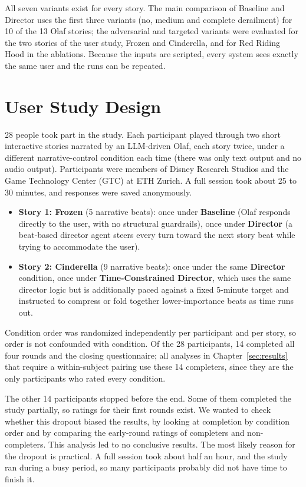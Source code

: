 All seven variants exist for every story. The main comparison of Baseline and Director uses the first three variants (no, medium and complete derailment) for 10 of the 13 Olaf stories; the adversarial and targeted variants were evaluated for the two stories of the user study, Frozen and Cinderella, and for Red Riding Hood in the ablations. Because the inputs are scripted, every system sees exactly the same user and the runs can be repeated.

\section{User Study Design}\label{sec:design-study}

28 people took part in the study. Each participant played through two short interactive stories narrated by an LLM-driven Olaf, each story twice, under a different narrative-control condition each time (there was only text output and no audio output). Participants were members of Disney Research Studios and the Game Technology Center (GTC) at ETH Zurich. A full session took about 25 to 30 minutes, and responses were saved anonymously.

\begin{itemize}
\item \textbf{Story 1: Frozen} (5 narrative beats): once under \textbf{Baseline} (Olaf responds directly to the user, with no structural guardrails), once under \textbf{Director} (a beat-based director agent steers every turn toward the next story beat while trying to accommodate the user).
\item \textbf{Story 2: Cinderella} (9 narrative beats): once under the same \textbf{Director} condition, once under \textbf{Time-Constrained Director}, which uses the same director logic but is additionally paced against a fixed 5-minute target and instructed to compress or fold together lower-importance beats as time runs out.
\end{itemize}

Condition order was randomized independently per participant and per story, so order is not confounded with condition. Of the 28 participants, 14 completed all four rounds and the closing questionnaire; all analyses in Chapter~\ref{sec:results} that require a within-subject pairing use these 14 completers, since they are the only participants who rated every condition.

The other 14 participants stopped before the end. Some of them completed the study partially, so ratings for their first rounds exist. We wanted to check whether this dropout biased the results, by looking at completion by condition order and by comparing the early-round ratings of completers and non-completers. This analysis led to no conclusive results. The most likely reason for the dropout is practical. A full session took about half an hour, and the study ran during a busy period, so many participants probably did not have time to finish it.

